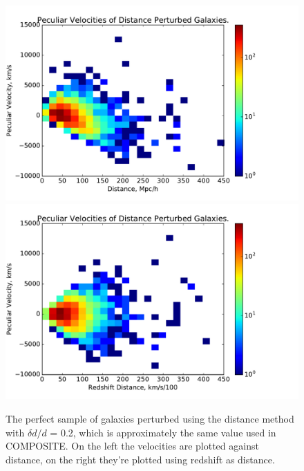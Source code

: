 \documentclass[usenatbib]{mn2e}
\begin{document}
\begin{figure}
\centering
\includegraphics[scale=0.35]{distance}
\hfill
\includegraphics[scale=0.35]{distancered}
\caption{\small The perfect sample of galaxies perturbed using the distance method with $\delta d/d$ = 0.2, which is approximately the same value used in COMPOSITE. On the left the velocities are plotted against distance, on the right they're plotted using redshift as distance.}
\label{fig:distance}
\end{figure}
\end{document}
